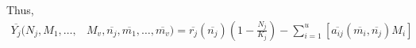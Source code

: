 \documentclass{amsart}
\theoremstyle{definition}
\theoremstyle{remark}
\numberwithin{equation}{section}
\begin{document}
Thus,
\begin{align*}
	\overline{Y_j}(N_j, M_1, \dots, &M_v, \overline{n_j}, \overline{m_1}, \dots, \overline{m_v}) = \overline{r_j}(\overline{n_j})\left(1 - \frac{N_j}{K_j}\right) - \sum\limits_{i = 1}^{u}\left[\overline{a_{ij}}(\overline{m_i}, \overline{n_j})M_i\right]
\end{align*}
\end{document}
